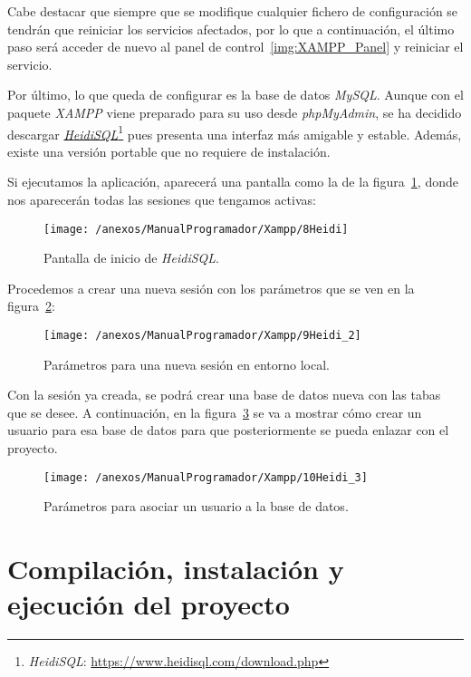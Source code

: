 Cabe destacar que siempre que se modifique cualquier fichero de configuración se tendrán que reiniciar los servicios afectados, por lo que a continuación, el último paso será acceder de nuevo al panel de control~\ref{img:XAMPP_Panel} y reiniciar el servicio.

Por último, lo que queda de configurar es la base de datos \textit{MySQL}. Aunque con el paquete \textit{XAMPP} viene preparado para su uso desde \textit{phpMyAdmin}, se ha decidido descargar \href{https://www.heidisql.com/download.php}{\textit{HeidiSQL}}\footnote{\textit{HeidiSQL}: \url{https://www.heidisql.com/download.php}} pues presenta una interfaz más amigable y estable. Además, existe una versión portable que no requiere de instalación.

Si ejecutamos la aplicación, aparecerá una pantalla como la de la figura~\ref{img:Heidi}, donde nos aparecerán todas las sesiones que tengamos activas:

\begin{figure}[h]
	\centering
	\texttt{[image: /anexos/ManualProgramador/Xampp/8Heidi]}
	\caption{Pantalla de inicio de \textit{HeidiSQL}.}
	\label{img:Heidi}
\end{figure}

Procedemos a crear una nueva sesión con los parámetros que se ven en la figura~\ref{img:Heidi_2}:

\begin{figure}[h]
	\centering
	\texttt{[image: /anexos/ManualProgramador/Xampp/9Heidi\_2]}
	\caption{Parámetros para una nueva sesión en entorno local.}
	\label{img:Heidi_2}
\end{figure}

Con la sesión ya creada, se podrá crear una base de datos nueva con las tabas que se desee. A continuación, en la figura~\ref{img:Heidi_3} se va a mostrar cómo crear un usuario para esa base de datos para que posteriormente se pueda enlazar con el proyecto. 

\begin{figure}[h]
	\centering
	\texttt{[image: /anexos/ManualProgramador/Xampp/10Heidi\_3]}
	\caption{Parámetros para asociar un usuario a la base de datos.}
	\label{img:Heidi_3}
\end{figure}

\newpage


\section{Compilación, instalación y ejecución del proyecto}

